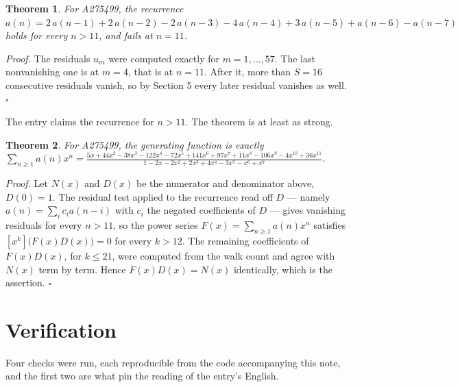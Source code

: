 \documentclass[11pt]{article}
\newtheorem{theorem}{Theorem}
\theoremstyle{definition}
\begin{document}
\begin{theorem} For A275499, the recurrence $a(n) = 2\,a(n-1) + 2\,a(n-2) - 2\,a(n-3) - 4\,a(n-4) + 3\,a(n-5) + a(n-6) - a(n-7)$ holds for every $n > 11$, and fails at $n = 11$.\end{theorem}

{\itshape Proof.} The residuals $u_m$ were computed exactly for $m = 1,\dots,57$. The last nonvanishing one is at $m = 4$, that is at $n = 11$. After it, more than $S = 16$ consecutive residuals vanish, so by Section 5 every later residual vanishes as well. $\square$

The entry claims the recurrence for $n > 11$. The theorem is at least as strong.

\begin{theorem} For A275499, the generating function is exactly $\sum_{n\ge 1} a(n)x^n = \frac{5x + 44x^{2} - 38x^{3} - 122x^{4} - 72x^{5} + 141x^{6} + 97x^{7} + 11x^{8} - 106x^{9} - 4x^{10} + 36x^{11}}{1 - 2x - 2x^{2} + 2x^{3} + 4x^{4} - 3x^{5} - x^{6} + x^{7}}$.\end{theorem}

{\itshape Proof.} Let $N(x)$ and $D(x)$ be the numerator and denominator above, $D(0)=1$. The residual test applied to the recurrence read off $D$ --- namely $a(n) = \sum_i c_i a(n-i)$ with $c_i$ the negated coefficients of $D$ --- gives vanishing residuals for every $n > 11$, so the power series $F(x)=\sum_{n\ge 1}a(n)x^n$ satisfies $[x^k]\bigl(F(x)D(x)\bigr) = 0$ for every $k > 12$. The remaining coefficients of $F(x)D(x)$, for $k \le 21$, were computed from the walk count and agree with $N(x)$ term by term. Hence $F(x)D(x) = N(x)$ identically, which is the assertion. $\square$

\section{Verification}

Four checks were run, each reproducible from the code accompanying this note, and the first two are what pin the reading of the entry's English.
\end{document}
